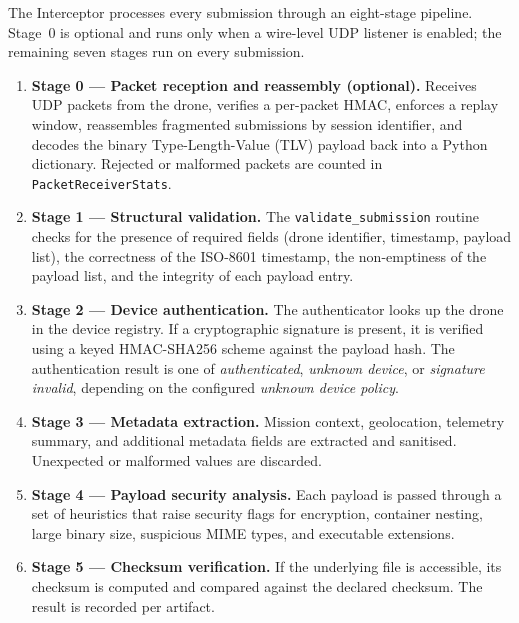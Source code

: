 \documentclass[12pt, a4paper]{report}
\begin{document}
The Interceptor processes every submission through an eight-stage
pipeline. Stage~0 is optional and runs only when a wire-level UDP
listener is enabled; the remaining seven stages run on every submission.

\begin{enumerate}
    \item \textbf{Stage 0 --- Packet reception and reassembly (optional).}
          Receives UDP packets from the drone, verifies a per-packet
          HMAC, enforces a replay window, reassembles fragmented
          submissions by session identifier, and decodes the binary
          Type-Length-Value (TLV) payload back into a Python
          dictionary. Rejected or malformed packets are counted in
          \texttt{PacketReceiverStats}.

    \item \textbf{Stage 1 --- Structural validation.} The
          \texttt{validate\_submission} routine checks for the presence of
          required fields (drone identifier, timestamp, payload list),
          the correctness of the ISO-8601 timestamp, the non-emptiness of
          the payload list, and the integrity of each payload entry.

    \item \textbf{Stage 2 --- Device authentication.} The authenticator
          looks up the drone in the device registry. If a cryptographic
          signature is present, it is verified using a keyed
          HMAC-SHA256 scheme against the payload hash. The authentication
          result is one of \emph{authenticated}, \emph{unknown device},
          or \emph{signature invalid}, depending on the configured
          \emph{unknown device policy}.

    \item \textbf{Stage 3 --- Metadata extraction.} Mission context,
          geolocation, telemetry summary, and additional metadata fields
          are extracted and sanitised. Unexpected or malformed values
          are discarded.

    \item \textbf{Stage 4 --- Payload security analysis.} Each payload is
          passed through a set of heuristics that raise security flags
          for encryption, container nesting, large binary size,
          suspicious MIME types, and executable extensions.

    \item \textbf{Stage 5 --- Checksum verification.} If the underlying
          file is accessible, its checksum is computed and compared
          against the declared checksum. The result is recorded per
          artifact.


\end{enumerate}
\end{document}
